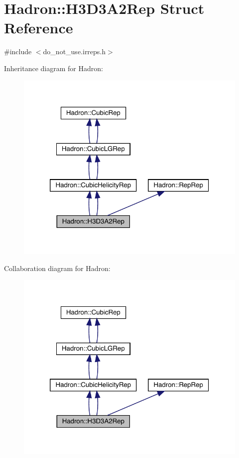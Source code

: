 \hypertarget{structHadron_1_1H3D3A2Rep}{}\section{Hadron\+:\+:H3\+D3\+A2\+Rep Struct Reference}
\label{structHadron_1_1H3D3A2Rep}


{\ttfamily \#include $<$do\+\_\+not\+\_\+use.\+irreps.\+h$>$}



Inheritance diagram for Hadron\+:\nopagebreak
\begin{figure}[H]
\begin{center}
\leavevmode
\includegraphics[width=320pt]{d9/ddc/structHadron_1_1H3D3A2Rep__inherit__graph}
\end{center}
\end{figure}


Collaboration diagram for Hadron\+:\nopagebreak
\begin{figure}[H]
\begin{center}
\leavevmode
\includegraphics[width=320pt]{d0/d92/structHadron_1_1H3D3A2Rep__coll__graph}
\end{center}
\end{figure}
